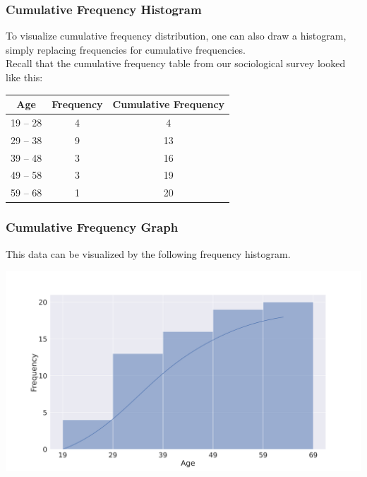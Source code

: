 \documentclass[aspectratio=169,11pt,svgnames,handout]{beamer}
\begin{document}
\begin{frame}
 \frametitle{Cumulative Frequency Histogram}
 To visualize \alert{cumulative frequency distribution}, one can also draw a
 histogram, simply replacing frequencies for cumulative frequencies.\\
 \pause
 Recall that the cumulative frequency table from our sociological survey looked
 like this:
 \begin{center}
  \begin{tabular}{c|c|c}
   \textbf{Age} & \textbf{Frequency} & \textbf{Cumulative Frequency}\\
   \toprule
   19 -- 28 & 4 & 4 \\
   29 -- 38 & 9 & 13 \\
   39 -- 48 & 3 & 16 \\
   49 -- 58 & 3 & 19 \\
   59 -- 68 & 1 & 20
  \end{tabular}
 \end{center}
\end{frame}

\begin{frame}
 \frametitle{Cumulative Frequency Graph}
 This data can be visualized by the following frequency histogram.
 \begin{center}
  \includegraphics[width=.7\textwidth]{survey_cumulative.png}
 \end{center}
\end{frame}
\end{document}
